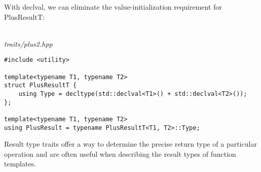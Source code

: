 With declval, we can eliminate the value-initialization requirement for PlusResultT:

\hspace*{\fill} \\ %
\noindent
\textit{traits/plus2.hpp}
\begin{lstlisting}[style=styleCXX]
#include <utility>

template<typename T1, typename T2>
struct PlusResultT {
	using Type = decltype(std::declval<T1>() + std::declval<T2>());
};

template<typename T1, typename T2>
using PlusResult = typename PlusResultT<T1, T2>::Type;
\end{lstlisting}

Result type traits offer a way to determine the precise return type of a particular operation and are often useful when describing the result types of function templates.




















